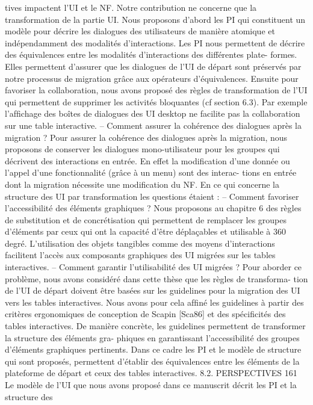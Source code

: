 \documentclass{article}
\begin{document}
tives impactent l’UI et le NF. Notre contribution ne concerne que la transformation de la partie
UI. Nous proposons d’abord les PI qui constituent un modèle pour décrire les dialogues des
utilisateurs de manière atomique et indépendamment des modalités d’interactions. Les PI nous
permettent de décrire des équivalences entre les modalités d’interactions des différentes plate-
formes. Elles permettent d’assurer que les dialogues de l’UI de départ sont préservés par notre
processus de migration grâce aux opérateurs d’équivalences.
Ensuite pour favoriser la collaboration, nous avons proposé des règles de transformation de l’UI
qui permettent de supprimer les activités bloquantes (cf section 6.3). Par exemple l’afﬁchage
des boîtes de dialogues des UI desktop ne facilite pas la collaboration sur une table interactive.
– Comment assurer la cohérence des dialogues après la migration ?
Pour assurer la cohérence des dialogues après la migration, nous proposons de conserver les
dialogues mono-utilisateur pour les groupes qui décrivent des interactions en entrée. En effet la
modiﬁcation d’une donnée ou l’appel d’une fonctionnalité (grâce à un menu) sont des interac-
tions en entrée dont la migration nécessite une modiﬁcation du NF.
En ce qui concerne la structure des UI par transformation les questions étaient :
– Comment favoriser l’accessibilité des éléments graphiques ?
Nous proposons au chapitre 6 des règles de substitution et de concrétisation qui permettent de
remplacer les groupes d’éléments par ceux qui ont la capacité d’être déplaçables et utilisable à
360 degré. L’utilisation des objets tangibles comme des moyens d’interactions facilitent l’accès
aux composants graphiques des UI migrées sur les tables interactives.
– Comment garantir l’utilisabilité des UI migrées ?
Pour aborder ce problème, nous avons considéré dans cette thèse que les règles de transforma-
tion de l’UI de départ doivent être basées sur les guidelines pour la migration des UI vers les
tables interactives. Nous avons pour cela afﬁné les guidelines à partir des critères ergonomiques
de conception de Scapin [Sca86] et des spéciﬁcités des tables interactives.
De manière concrète, les guidelines permettent de transformer la structure des éléments gra-
phiques en garantissant l’accessibilité des groupes d’éléments graphiques pertinents. Dans ce
cadre les PI et le modèle de structure qui sont proposés, permettent d’établir des équivalences
entre les éléments de la plateforme de départ et ceux des tables interactives.
8.2. PERSPECTIVES
161
Le modèle de l’UI que nous avons proposé dans ce manuscrit décrit les PI et la structure des
\end{document}
